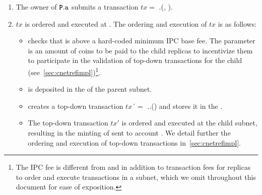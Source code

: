 \begin{enumerate}
    \item The owner of $\textbf{\texttt{P}}.\texttt{a}$ submits a transaction $tx=$ \gw.(, ).
    \item $tx$ is ordered and executed at . The ordering and execution of $tx$ is as follows:
    \begin{itemize}
        \item \gw checks that  is above a hard-coded minimum IPC base fee. The parameter  is an amount of coins to be paid to the child replicas to incentivize them to participate in the validation of top-down transactions for the child (see~\cref{sec:cnetrefimpl})\footnote{The IPC fee is different from and in addition to transaction fees for replicas to order and execute transactions in a subnet, which we omit throughout this document for ease of exposition.}. 
        \item {} is deposited in the \gw of the parent subnet.
        \item \gw creates a top-down transaction $tx´=$ .\gw.() and stores it in the \tqueue.
        \item The top-down transaction $tx'$ is ordered and executed at the child subnet, resulting in the minting of  sent to account . We detail further the ordering and execution of top-down transactions in~\cref{sec:cnetrefimpl}.
    \end{itemize}
\end{enumerate}

